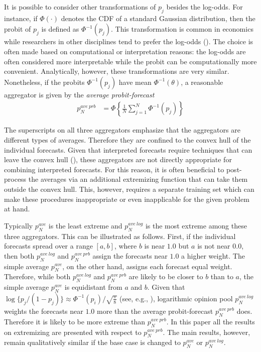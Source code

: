 \documentclass[11pt]{article}
\theoremstyle{definition}
\theoremstyle{definition}
\begin{document}
It is possible to consider other transformations of $p_j$ besides the log-odds. For instance,  if $\Phi(\cdot)$ denotes the CDF of a standard Gaussian distribution, then the probit of $p_j$ is defined as $\Phi^{-1}(p_j)$. This transformation is common in economics while researchers in other disciplines tend to prefer the log-odds (\cite{bryan2013regression}). The choice is often made based on computational or interpretation reasons: the log-odds are often considered more interpretable while the probit can be computationally more convenient. Analytically, however, these transformations are very similar.
 Nonetheless, if the probits $\Phi^{-1}(p_j)$ have mean $\Phi^{-1}(\theta)$, a reasonable aggregator is given by the \textit{average probit-forecast}
\begin{align*}
p_N^{ave\ prb} &= \Phi \left\{ \frac{1}{N} \sum_{j=1}^N \Phi^{-1}(p_j) \right\}
\end{align*}

The superscripts on all three aggregators emphasize that the aggregators are different types of averages. Therefore they are confined to the convex hull of the individual forecasts. Given that interpreted forecasts require techniques that can leave the convex hull (\cite{parunak2013characterizing}), these aggregators are not directly appropriate for combining interpreted forecasts. For this reason, it is often beneficial to post-process the averages via an additional extremizing function that can take them outside the convex hull. This, however, requires a separate training set which can make these procedures inappropriate or even inapplicable for the given problem at hand. 

Typically $p_N^{ave}$ is the least extreme and $p_N^{ave\ log}$ is the most extreme among these three aggregators. This can be illustrated as follows. First, if the individual forecasts spread over a range $[a,b]$, where $b$ is near $1.0$ but $a$ is not near $0.0$, then both $p_N^{ave\ log}$ and $p_N^{ave\ prb}$ assign the forecasts near $1.0$ a higher weight. The simple average $p_N^{ave}$, on the other hand, assigns each forecast equal weight. Therefore, while both $p_N^{ave\ log}$ and $p_N^{ave\ prb}$ are likely to be closer to $b$ than to $a$, the simple average $p_N^{ave}$ is equidistant from $a$ and $b$. Given that $\log\{p_j / (1-p_j)\} \approx \Phi^{-1}(p_i)/\sqrt{\frac{\pi}{8}}$ (see, e.g., \cite{train2009discrete}),  logarithmic opinion pool $p_N^{ave\ log}$ weights the forecasts near $1.0$ more than the average probit-forecast $p_N^{ave\ prb}$ does. Therefore it is likely to be more extreme than $p_N^{ave\ prb}$.  In this paper all the results on extremizing are presented with respect to $p_N^{ave\ prb}$. The main results, however, remain qualitatively similar if the base case is changed to $p_N^{ave}$ or $p_N^{ave\ log}$.
\end{document}
